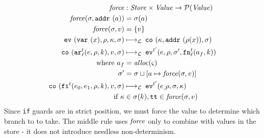 \documentclass[preprint,onecolumn,9pt]{sigplanconf} %
\begin{document}
\renewcommand{\ext}{\mathit{ext}}
{\small
\begin{align*}
\spchoice
{\force &: \Store \times \Value \to \Set(\Value) \\
 \force(\msto,\saddr{\maddr}) &= \msto(\maddr) \\
 \force(\msto,\mval) &= \setof{\mval}}
{\force &: \Value \to \Set(\Value) \\
 \force(\superposition{\mval{s}}) &= \mval{s} \\
 \force(\mval) &= \{\mval\}}
\\
%
\ev{\svar{\mvar},\menv,\mkont,\msto} &\lmachstep\;
\spchoice
{\co{\mkont,\saddr{\menv(\mvar)},\msto}}
{\co{\mkont,\superposition{\msto(\menv(\mvar))},\msto}} \\
%
\co{\kar[^\mcntr_\mlab]{\mexp,\menv,\mkaddr},\mval,\msto}
&\lmachstep\;
\ev[^{\mcntr'}]{\mexp,\menv,\msto',\kfn[^\mcntr_\mlab]{\maddr_f,\mkaddr}} \\
\text{ where }
\maddr_f &= \alloc(\mstate) \\
\msto' &=
\spchoice
{\msto \sqcup[\maddr \mapsto \force(\msto,\mval)]}
{\msto \sqcup[\maddr \mapsto \force(\mval)]} \\
%
\co{\kif[^\mcntr]{\mexpi0,\mexpi1,\menv,\mkaddr},\mval,\msto}
&\lmachstep\;
\ev[^{\mcntr'}]{\mexpi,\menv,\msto,\mkont} \\
\text{ if } \mkont &\in \msto(\mkaddr),
            \strue \in \spchoice{\force(\msto,\mval)}{\force(\mval)}
\end{align*}}
Since {\tt if} guards are in strict position, we must force the value
to determine which branch to to take. The middle rule uses $\mathit{force}$
only to combine with values in the store - it does not introduce
needless non-determinism.
\end{document}
